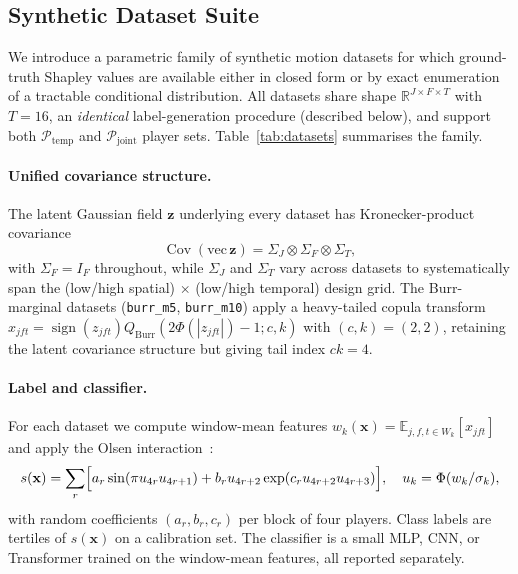 \subsection{Synthetic Dataset Suite}
\label{sec:synthetic}

We introduce a parametric family of synthetic motion datasets for which
ground-truth Shapley values are available either in closed form or by
exact enumeration of a tractable conditional distribution.  All datasets
share shape $\mathbb{R}^{J \times F \times T}$ with $T{=}16$, an
\emph{identical} label-generation procedure (described below), and
support both $\mathcal{P}_{\mathrm{temp}}$ and $\mathcal{P}_{\mathrm{joint}}$
player sets.  Table~\ref{tab:datasets} summarises the family.



\paragraph{Unified covariance structure.}
The latent Gaussian field $\mathbf{z}$ underlying every dataset has
Kronecker-product covariance
\begin{equation}
  \operatorname{Cov}(\mathrm{vec}\,\mathbf{z})
  = \Sigma_J \otimes \Sigma_F \otimes \Sigma_T,
  \label{eq:kronecker}
\end{equation}
with $\Sigma_F = I_F$ throughout, while $\Sigma_J$ and $\Sigma_T$ vary
across datasets to systematically span the (low/high spatial) $\times$
(low/high temporal) design grid.  The Burr-marginal datasets
(\texttt{burr\_m5}, \texttt{burr\_m10}) apply a heavy-tailed copula
transform $x_{jft} = \operatorname{sign}(z_{jft})Q_{\mathrm{Burr}}(2\Phi(|z_{jft}|)-1; c, k)$
with $(c,k){=}(2,2)$, retaining the latent covariance structure but giving
tail index $ck{=}4$.

\paragraph{Label and classifier.}
For each dataset we compute window-mean features
$w_k(\mathbf{x}) = \mathbb{E}_{j,f,t \in W_k}[x_{jft}]$ and apply
the Olsen interaction~\citep{olsen2022using}:
\begin{equation}
  s(\mathbf{x})
  = \sum_r \Bigl[
    a_r \sin(\pi u_{4r} u_{4r+1})
    + b_r u_{4r+2} \exp(c_r u_{4r+2} u_{4r+3})
  \Bigr],
  \quad u_k = \Phi(w_k/\sigma_k),
  \label{eq:olsen}
\end{equation}
with random coefficients $(a_r, b_r, c_r)$ per block of four players.
Class labels are tertiles of $s(\mathbf{x})$ on a calibration set.
The classifier is a small MLP, CNN, or Transformer trained on the
window-mean features, all reported separately.


